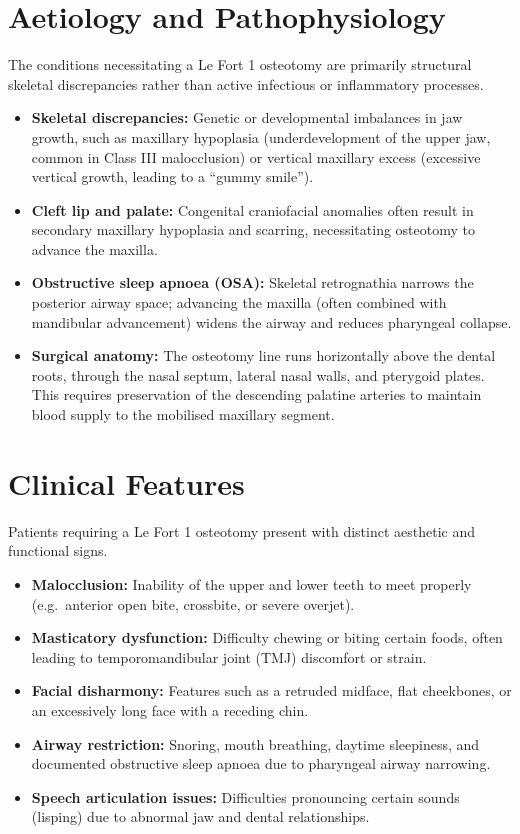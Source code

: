\section*{Aetiology and Pathophysiology}
The conditions necessitating a Le Fort 1 osteotomy are primarily structural skeletal discrepancies rather than active infectious or inflammatory processes.
\begin{itemize}
    \item \textbf{Skeletal discrepancies:} Genetic or developmental imbalances in jaw growth, such as maxillary hypoplasia (underdevelopment of the upper jaw, common in Class III malocclusion) or vertical maxillary excess (excessive vertical growth, leading to a ``gummy smile'').
    \item \textbf{Cleft lip and palate:} Congenital craniofacial anomalies often result in secondary maxillary hypoplasia and scarring, necessitating osteotomy to advance the maxilla.
    \item \textbf{Obstructive sleep apnoea (OSA):} Skeletal retrognathia narrows the posterior airway space; advancing the maxilla (often combined with mandibular advancement) widens the airway and reduces pharyngeal collapse.
    \item \textbf{Surgical anatomy:} The osteotomy line runs horizontally above the dental roots, through the nasal septum, lateral nasal walls, and pterygoid plates. This requires preservation of the descending palatine arteries to maintain blood supply to the mobilised maxillary segment.
\end{itemize}

\section*{Clinical Features}
Patients requiring a Le Fort 1 osteotomy present with distinct aesthetic and functional signs.
\begin{itemize}
    \item \textbf{Malocclusion:} Inability of the upper and lower teeth to meet properly (e.g.\ anterior open bite, crossbite, or severe overjet).
    \item \textbf{Masticatory dysfunction:} Difficulty chewing or biting certain foods, often leading to temporomandibular joint (TMJ) discomfort or strain.
    \item \textbf{Facial disharmony:} Features such as a retruded midface, flat cheekbones, or an excessively long face with a receding chin.
    \item \textbf{Airway restriction:} Snoring, mouth breathing, daytime sleepiness, and documented obstructive sleep apnoea due to pharyngeal airway narrowing.
    \item \textbf{Speech articulation issues:} Difficulties pronouncing certain sounds (lisping) due to abnormal jaw and dental relationships.
\end{itemize}

